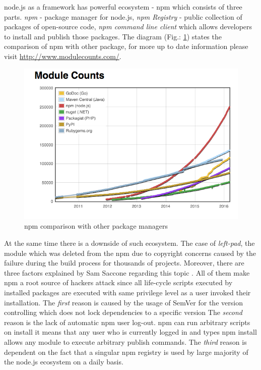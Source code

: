 node.js as a framework has powerful ecosystem - npm which consists of three parts. \textit{npm} - package manager for node.js, \textit{npm Registry} - public collection of packages of open-source code, \textit{npm command line client} which allows developers to install and publish those packages. The diagram (Fig.: \ref{fig:npmStat}) states the comparison of npm with other package, for more up to date information please visit \url{http://www.modulecounts.com/}.
\begin{figure}[ht]
	\label{fig:npmStat}
	\centering
	\includegraphics[width=\textwidth]{grafiken/modulecounts.png}
	\caption{npm comparison with other package managers\cite{moduleCounts}}
\end{figure}

At the same time there is a downside of such ecosystem. The case of \textit{left-pad}, the module which was deleted from the npm due to copyright concerns caused by the failure during the build process for thousands of projects\cite{npmDown}. Moreover, there are three factors explained by Sam Saccone regarding this topic \cite{npmHydra} \cite{npmSoft}. All of them make npm a root source of hackers attack since all life-cycle scripts executed by installed packages are executed with same privilege level as a user invoked their installation. The \textit{first} reason is caused by the usage of SemVer for the version controlling which does not lock dependencies to a specific version The\textit{ second }reason is the lack of automatic npm user log-out.  npm can run arbitrary scripts on install it means that any user who is currently logged in and types npm install allows any module to execute arbitrary publish commands. The \textit{third} reason is dependent on the fact that a singular npm registry is used by large majority of the node.js ecosystem on a daily basis.

